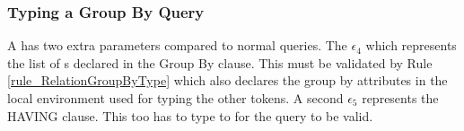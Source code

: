 
\subsubsection{Typing a Group By Query}
A  has two extra parameters compared to normal queries.
The  $\epsilon_4$ which represents the list of s declared in the Group By clause.
This must be validated by Rule \ref{rule_RelationGroupByType} which also declares the group by attributes in the local environment used for typing the other tokens.
A second  $\epsilon_5$ represents the HAVING clause. 
This too has to type to  for the query to be valid.

